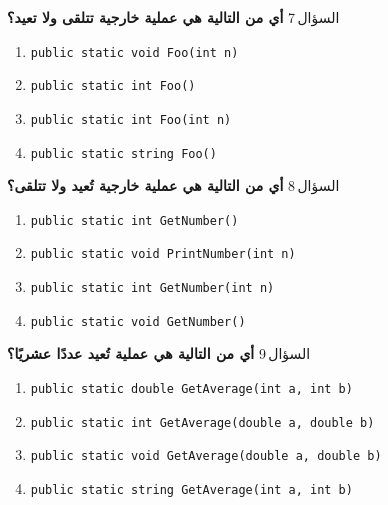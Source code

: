 \documentclass[13pt]{beamer}
\begin{document}
\begin{frame}[fragile]{السؤال\,7}
\textbf{أي من التالية هي عملية خارجية تتلقى ولا تعيد؟}

\begin{english}
\begin{enumerate}[label=(\alph*)]
  \item \texttt{public static void Foo(int n)}
  \item \texttt{public static int Foo()}
  \item \texttt{public static int Foo(int n)}
  \item \texttt{public static string Foo()}
\end{enumerate}
\end{english}
\end{frame}

\begin{frame}[fragile]{السؤال\,8}
\textbf{أي من التالية هي عملية خارجية تُعيد ولا تتلقى؟}

\begin{english}
\begin{enumerate}[label=(\alph*)]
  \item \texttt{public static int GetNumber()}
  \item \texttt{public static void PrintNumber(int n)}
  \item \texttt{public static int GetNumber(int n)}
  \item \texttt{public static void GetNumber()}
\end{enumerate}
\end{english}
\end{frame}

\begin{frame}[fragile]{السؤال\,9}
\textbf{أي من التالية هي عملية تُعيد عددًا عشريًا؟}

\begin{english}
\begin{enumerate}[label=(\alph*)]
  \item \texttt{public static double GetAverage(int a, int b)}
  \item \texttt{public static int GetAverage(double a, double b)}
  \item \texttt{public static void GetAverage(double a, double b)}
  \item \texttt{public static string GetAverage(int a, int b)}
\end{enumerate}
\end{english}
\end{frame}
\end{document}
